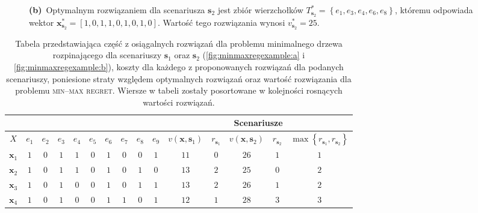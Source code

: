 \begin{figure}[!htbp]
{		\textbf{(b)}~Optymalnym rozwiązaniem dla scenariusza $\textbf{s}_{2}$ jest zbiór wierzchołków $T^{\ast}_{\textbf{s}_{2}} = \left\{ e_{1}, e_{3}, e_{4}, e_{6}, e_{8} \right\}$, któremu odpowiada wektor $\textbf{x}^{\ast}_{\textbf{s}_{2}} = \left[ 1, 0, 1, 1, 0, 1, 0, 1, 0 \right]$. Wartość tego rozwiązania wynosi $v^{\ast}_{\textbf{s}_{2}} = 25$.
	}
	\label{fig:minmaxregexample}
\end{figure}

\begin{table}[!htbp]
	\caption{Tabela przedstawiająca część z osiągalnych rozwiązań dla problemu minimalnego drzewa rozpinającego dla scenariuszy $\textbf{s}_{1}$ oraz $\textbf{s}_{2}$ (\ref{fig:minmaxregexample:a} i \ref{fig:minmaxregexample:b}), koszty dla każdego z proponowanych rozwiązań dla podanych scenariuszy, poniesione straty względem optymalnych rozwiązań oraz wartość rozwiązania dla problemu \textsc{min--max regret}. Wiersze w tabeli zostały posortowane w kolejności rosnących wartości rozwiązań.}
	\label{tab:minmaxregexample2}
	\centering
	\begin{tabular}{ccccccccccccccc}
		\cline{11-15}
		\multicolumn{2}{c}{}       &         &         &         &         &         &         &         &         & \multicolumn{5}{c}{Scenariusze}                                                                                                                                                                                             \\ \hline
		$X$              & $e_{1}$ & $e_{2}$ & $e_{3}$ & $e_{4}$ & $e_{5}$ & $e_{6}$ & $e_{7}$ & $e_{8}$ & $e_{9}$ & $v \left( \textbf{x}, \textbf{s}_{1} \right) $ & $r_{\textbf{s}_{1}}$  & $v \left( \textbf{x}, \textbf{s}_{2} \right) $ &  $r_{\textbf{s}_{2}}$ & $\max \left\{ r_{\textbf{s}_{1}}, r_{\textbf{s}_{2}} \right\} $ \\ \hline
		$\textbf{x}_{1}$ & $1$     & $0$     & $1$     & $1$     & $0$     & $1$     & $0$     & $0$	&	$1$	&	$11$	&	$0$	&	$26$	&	$1$	&	$1$	\\
		$\textbf{x}_{2}$ & $1$     & $0$     & $1$     & $1$     & $0$     & $1$     & $0$     & $1$	&	$0$	&	$13$	&	$2$	&	$25$	&	$0$	&	$2$	\\
		$\textbf{x}_{3}$ & $1$     & $0$     & $1$     & $0$     & $0$     & $1$     & $0$     & $1$	&	$1$	&	$13$	&	$2$	&	$26$	&	$1$	&	$2$	\\
		$\textbf{x}_{4}$ & $1$     & $0$     & $1$     & $0$     & $0$     & $1$     & $1$     & $0$	&	$1$	&	$12$	&	$1$	&	$28$	&	$3$	&	$3$	\\

\end{tabular}
\end{table}
